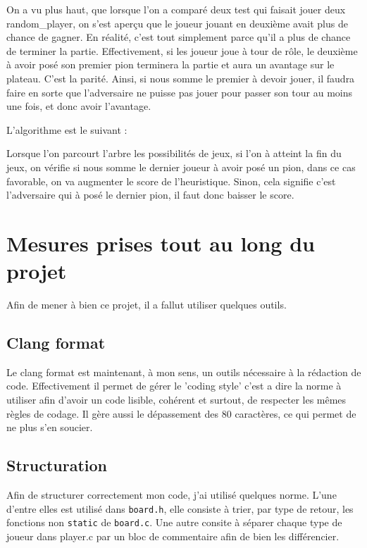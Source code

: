 \documentclass{report}
\begin{document}
On a vu plus haut, que lorsque l'on a comparé deux test qui faisait jouer deux random\_player, on s'est aperçu que le joueur jouant en deuxième avait plus de chance de gagner. En réalité, c'est tout simplement parce qu'il a plus de chance de terminer la partie. Effectivement, si les joueur joue à tour de rôle, le deuxième à avoir posé son premier pion terminera la partie et aura un avantage sur le plateau. C'est la parité. Ainsi, si nous somme le premier à devoir jouer, il faudra faire en sorte que l'adversaire ne puisse pas jouer pour passer son tour au moins une fois, et donc avoir l'avantage.

L'algorithme est le suivant :

Lorsque l'on parcourt l'arbre les possibilités de jeux, si l'on à atteint la fin du jeux, on vérifie si nous somme le dernier joueur à avoir posé un pion, dans ce cas favorable, on va augmenter le score de l'heuristique. Sinon, cela signifie c'est l'adversaire qui à posé le dernier pion, il faut donc baisser le score.

\chapter{Mesures prises tout au long du projet}

Afin de mener à bien ce projet, il a fallut utiliser quelques outils.

\section{Clang format}
Le clang format est maintenant, à mon sens, un outils nécessaire à la rédaction de code. Effectivement il permet de gérer le 'coding style' c'est a dire la norme à utiliser afin d'avoir un code lisible, cohérent et surtout, de respecter les mêmes règles de codage. Il gère aussi le dépassement des 80 caractères, ce qui permet de ne plus s'en soucier.

\section{Structuration}
Afin de structurer correctement mon code, j'ai utilisé quelques norme. L'une d'entre elles est utilisé dans \texttt{board.h}, elle consiste à trier, par type de retour, les fonctions non \texttt{static} de \texttt{board.c}. Une autre consite à séparer chaque type de joueur dans player.c par un bloc de commentaire afin de bien les différencier.\newline
\end{document}
